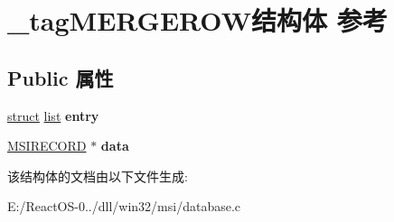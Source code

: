 \hypertarget{struct__tag_m_e_r_g_e_r_o_w}{}\section{\+\_\+tag\+M\+E\+R\+G\+E\+R\+O\+W结构体 参考}
\label{struct__tag_m_e_r_g_e_r_o_w}
\subsection*{Public 属性}
\begin{DoxyCompactItemize}
\item 
\mbox{\label{struct__tag_m_e_r_g_e_r_o_w_a3f940517466efa0adea96157927de85c}} 
\hyperlink{interfacestruct}{struct} \hyperlink{classlist}{list} {\bfseries entry}
\item 
\mbox{\label{struct__tag_m_e_r_g_e_r_o_w_af2d1c8b58f8ea095a0ad75321e0a2da6}} 
\hyperlink{structtag_m_s_i_r_e_c_o_r_d}{M\+S\+I\+R\+E\+C\+O\+RD} $\ast$ {\bfseries data}
\end{DoxyCompactItemize}


该结构体的文档由以下文件生成\+:\begin{DoxyCompactItemize}
\item 
E\+:/\+React\+O\+S-\/0../dll/win32/msi/database.\+c\end{DoxyCompactItemize}
